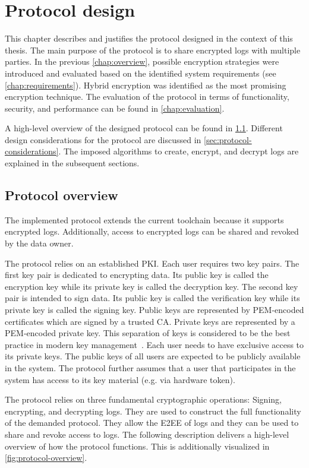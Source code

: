 \documentclass[../main.tex]{subfiles}
\begin{document}
\chapter{Protocol design}
\label{chap:design}

This chapter describes and justifies the protocol designed in the context of this thesis.
The main purpose of the protocol is to share encrypted logs with multiple parties.
In the previous \cref{chap:overview}, possible encryption strategies were introduced and evaluated based on the identified system requirements (see \cref{chap:requirements}).
Hybrid encryption was identified as the most promising encryption technique.
The evaluation of the protocol in terms of functionality, security, and performance can be found in \cref{chap:evaluation}.

A high-level overview of the designed protocol can be found in \cref{sec:overview}.
Different design considerations for the protocol are discussed in \cref{sec:protocol-considerations}.
The imposed algorithms to create, encrypt, and decrypt logs are explained in the subsequent sections. 

\section{Protocol overview}
\label{sec:overview}

The implemented protocol extends the current toolchain because it supports encrypted logs.
Additionally, access to encrypted logs can be shared and revoked by the data owner.

The protocol relies on an established PKI.
Each user requires two key pairs.
The first key pair is dedicated to encrypting data.
Its public key is called the encryption key while its private key is called the decryption key.
The second key pair is intended to sign data.
Its public key is called the verification key while its private key is called the signing key.
Public keys are represented by PEM-encoded certificates which are signed by a trusted CA.
Private keys are represented by a PEM-encoded private key.
This separation of keys is considered to be the best practice in modern key management~\cite[33]{Barker2006}.
Each user needs to have exclusive access to its private keys.
The public keys of all users are expected to be publicly available in the system.
The protocol further assumes that a user that participates in the system has access to its key material (e.g. via hardware token).

The protocol relies on three fundamental cryptographic operations:
Signing, encrypting, and decrypting logs.
They are used to construct the full functionality of the demanded protocol.
They allow the E2EE of logs and they can be used to share and revoke access to logs.
The following description delivers a high-level overview of how the protocol functions.
This is additionally visualized in \cref{fig:protocol-overview}.
\end{document}
